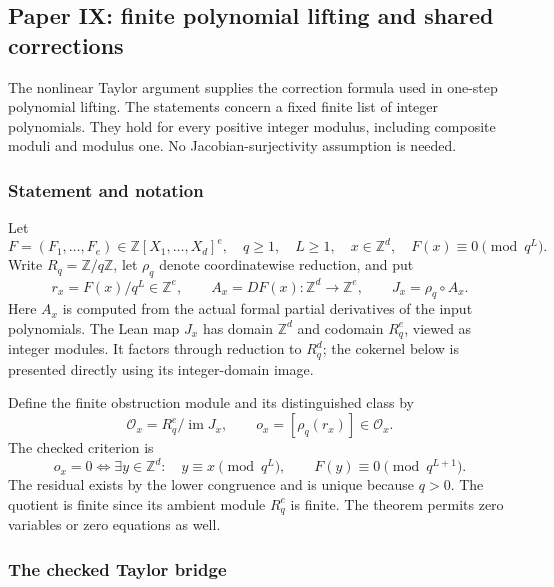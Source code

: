 \hypertarget{cont1:paper-ix-finite-polynomial-lifting-and-shared-corrections}{%
\subsection{Paper IX: finite polynomial lifting and shared
corrections}\label{cont1:paper-ix-finite-polynomial-lifting-and-shared-corrections}}

The nonlinear Taylor argument supplies the correction formula used in
one-step polynomial lifting. The statements concern a fixed
finite list of integer polynomials. They hold for every positive integer
modulus, including composite moduli and modulus one. No
Jacobian-surjectivity assumption is needed.

\hypertarget{cont1:statement-and-notation}{%
\subsubsection{Statement and notation}\label{cont1:statement-and-notation}}

Let \[
F=(F_1,\ldots,F_e)\in\mathbb Z[X_1,\ldots,X_d]^e,
\quad q\ge1,\quad L\ge1,
\quad x\in\mathbb Z^d,
\quad F(x)\equiv0\pmod{q^L}.
\] Write \(R_q=\mathbb Z/q\mathbb Z\), let \(\rho_q\) denote
coordinatewise reduction, and put \[
r_x=F(x)/q^L\in\mathbb Z^e,
\qquad A_x=DF(x):\mathbb Z^d\longrightarrow\mathbb Z^e,
\qquad J_x=\rho_q\circ A_x.
\] Here \(A_x\) is computed from the actual formal partial derivatives
of the input polynomials. The Lean map \(J_x\) has domain
\(\mathbb Z^d\) and codomain \(R_q^e\), viewed as integer modules. It
factors through reduction to \(R_q^d\); the cokernel below is presented
directly using its integer-domain image.

Define the finite obstruction module and its distinguished class by \[
\mathcal O_x=R_q^e/\operatorname{im}J_x,
\qquad o_x=[\rho_q(r_x)]\in\mathcal O_x.
\] The checked criterion is \[
\boxed{
 o_x=0
 \iff
 \exists y\in\mathbb Z^d:\quad
 y\equiv x\pmod{q^L},\qquad F(y)\equiv0\pmod{q^{L+1}}.
}
\] The residual exists by the lower congruence and is unique because
\(q>0\). The quotient is finite since its ambient module \(R_q^e\) is
finite. The theorem permits zero variables or zero equations as well.

\hypertarget{cont1:the-checked-taylor-bridge}{%
\subsubsection{The checked Taylor
bridge}\label{cont1:the-checked-taylor-bridge}}

